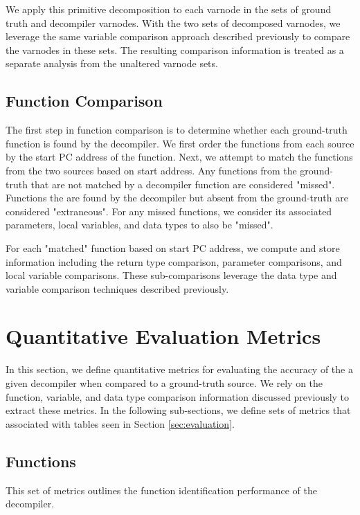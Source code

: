 We apply this primitive decomposition to each varnode in the sets of ground truth and decompiler varnodes. With the two sets of decomposed varnodes, we leverage the same variable comparison approach described previously to compare the varnodes in these sets. The resulting comparison information is treated as a separate analysis from the unaltered varnode sets.

\subsection{Function Comparison}

The first step in function comparison is to determine whether each ground-truth function is found by the decompiler. We first order the functions from each source by the start PC address of the function. Next, we attempt to match the functions from the two sources based on start address. Any functions from the ground-truth that are not matched by a decompiler function are considered "missed". Functions the are found by the decompiler but absent from the ground-truth are considered "extraneous". For any missed functions, we consider its associated parameters, local variables, and data types to also be "missed".

For each "matched" function based on start PC address, we compute and store information including the return type comparison, parameter comparisons, and local variable comparisons. These sub-comparisons leverage the data type and variable comparison techniques described previously.

\section{Quantitative Evaluation Metrics}

In this section, we define quantitative metrics for evaluating the accuracy of the a given decompiler when compared to a ground-truth source. We rely on the function, variable, and data type comparison information discussed previously to extract these metrics. In the following sub-sections, we define sets of metrics that associated with tables seen in Section \ref{sec:evaluation}.

\subsection{Functions}

This set of metrics outlines the function identification performance of the decompiler.

